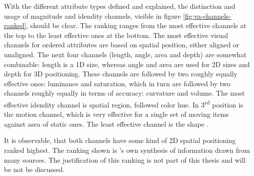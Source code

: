 With the different attribute types defined and explained, the distinction and usage of magnitude and idendity channels, visible in figure \ref{fig:va-channels-ranked}, should be clear. The ranking ranges from the most effective channels at the top to the least effective ones at the bottom. The most effective visual channels for ordered attributes are based on spatial position, either aligned or unaligned. The next four channels (length, angle, area and depth) are somewhat combinable: length is a 1D size, whereas angle and area are used for 2D sizes and depth for 3D positioning. These channels are followed by two roughly equally effective ones: luminance and saturation, which in turn are followed by two channels roughly equally in terms of accuracy: curvature and volume. The most effective idendity channel is spatial region, followed color hue. In 3\textsuperscript{rd} position is the motion channel, which is very effective for a single set of moving items against asea of static ones. The least effective channel is the shape .

It is observable, that both channels have some kind of 2D spatial positioning ranked highest. The ranking shown is \citeauthor{Munzner2014}'s own synthesis of information drawn from many sources. The justification of this ranking is not part of this thesis and will be not be discussed.
